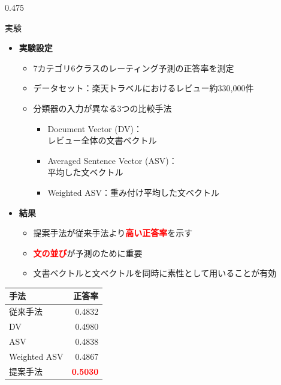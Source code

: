 \documentclass[unicode,10pt]{beamer}
\newcommand{\itemtitle}[1]{\textbf{#1}\\}
\newcommand{\fire}[1]{\textcolor{red}{\textbf{#1}}}
\newcommand{\columnsize}{0.475\textwidth}
\begin{document}
\begin{frame}
\begin{columns}[onlytextwidth,t]
\begin{column}{\columnsize}
  \begin{block}{実験}
    \begin{itemize}
      \item \itemtitle{実験設定}
        \begin{itemize}
          \item 7カテゴリ6クラスのレーティング予測の正答率を測定
          \item データセット：楽天トラベルにおけるレビュー約330,000件
          \item 分類器の入力が異なる3つの比較手法
            \begin{itemize}
              \item Document Vector (DV)：\\レビュー全体の文書ベクトル
              \item Averaged Sentence Vector (ASV)：\\平均した文ベクトル
              \item Weighted ASV：重み付け平均した文ベクトル
            \end{itemize}
        \end{itemize}
    \end{itemize}

    \begin{multicols}{2}
      \begin{itemize}
        \item \itemtitle{結果}
          \begin{itemize}
            \item 提案手法が従来手法より\fire{高い正答率}を示す
            \item \fire{文の並び}が予測のために重要
            \item 文書ベクトルと文ベクトルを同時に素性として用いることが有効
          \end{itemize}
      \end{itemize}
      \columnbreak
      \begin{table}
        \centering
        \begin{tabular}{l | r}
          手法 & 正答率 \\
          \hline
          従来手法\cite{fujitani15} & 0.4832 \\
          DV & 0.4980 \\
          ASV & 0.4838 \\
          Weighted ASV & 0.4867 \\
          提案手法 & \fire{0.5030} \\
        \end{tabular}
      \end{table}
    \end{multicols}
  \end{block}


\end{column}
\end{columns}
\end{frame}
\end{document}
